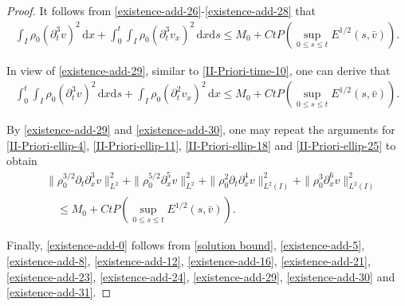 \documentclass[11pt, reqno]{amsart}
\newcommand{\diff}{\mathrm{d}}
\numberwithin{equation}{section}
\begin{document}
{\begin{proof}
It follows from \eqref{existence-add-26}-\eqref{existence-add-28} that
\begin{equation}\label{existence-add-29}
\begin{aligned}
\int_I \rho_0(\partial_t^3v)^2\,\diff x
+\int_0^t\int_I\rho_0(\partial_t^3v_x)^2\,\diff x\diff s
\leq M_0+Ct P(\sup_{0\leq s\leq t}E^{1/2}(s,\bar{v})).
\end{aligned}
\end{equation}

\bigskip
{}  In view of \eqref{existence-add-29}, similar to \eqref{II-Priori-time-10}, one can derive that
\begin{equation}\label{existence-add-30}
\begin{aligned}
\int_0^t\int_I \rho_0(\partial_t^3v)^2\,\diff x\diff s
+\int_I\rho_0(\partial_t^2v_x)^2\,\diff x
\leq M_0+Ct P(\sup_{0\leq s\leq t}E^{1/2}(s,\bar{v})).
\end{aligned}
\end{equation}

\bigskip
{}
By \eqref{existence-add-29} and \eqref{existence-add-30}, one may repeat the arguments for \eqref{II-Priori-ellip-4}, \eqref{II-Priori-ellip-11}, \eqref{II-Priori-ellip-18} and \eqref{II-Priori-ellip-25} to obtain   
\begin{equation}\label{existence-add-31}
\begin{aligned}
&\|\rho_0^{3/2}\partial_t\partial_x^3v\|_{L^2}^2+\|\rho_0^{5/2}\partial_x^5v\|_{L^2}^2+\|\rho_0^2\partial_t\partial_x^4v\|_{L^2(I)}^2+\|\rho_0^3\partial_x^6v\|_{L^2(I)}^2\\
&\quad\leq M_0+Ct P(\sup_{0\leq s\leq t}E^{1/2}(s,\bar{v})). 
\end{aligned}
\end{equation}



Finally, \eqref{existence-add-0} follows from \eqref{solution bound}, \eqref{existence-add-5}, \eqref{existence-add-8}, \eqref{existence-add-12}, \eqref{existence-add-16}, \eqref{existence-add-21}, \eqref{existence-add-23}, \eqref{existence-add-24}, \eqref{existence-add-29}, \eqref{existence-add-30} and \eqref{existence-add-31}.

\end{proof}









}
\end{document}
